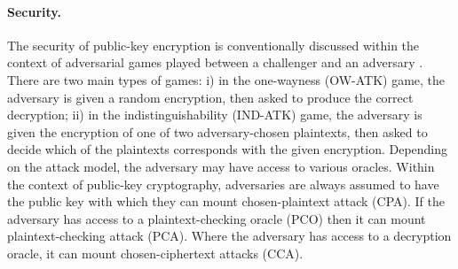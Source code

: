 \documentclass[runningheads]{llncs}
\begin{document}
\paragraph{Security.} The security of public-key encryption is conventionally discussed within the context of adversarial games played between a challenger and an adversary \cite{DBLP:conf/stoc/GoldwasserM82}. There are two main types of games: i) in the one-wayness (OW-ATK) game, the adversary is given a random encryption, then asked to produce the correct decryption; ii) in the indistinguishability (IND-ATK) game, the adversary is given the encryption of one of two adversary-chosen plaintexts, then asked to decide which of the plaintexts corresponds with the given encryption. Depending on the attack model, the adversary may have access to various oracles. Within the context of public-key cryptography, adversaries are always assumed to have the public key with which they can mount chosen-plaintext attack (CPA). If the adversary has access to a plaintext-checking oracle (PCO) \cite{DBLP:conf/ctrsa/OkamotoP01} then it can mount plaintext-checking attack (PCA). Where the adversary has access to a decryption oracle, it can mount chosen-ciphertext attacks (CCA). 
\end{document}
